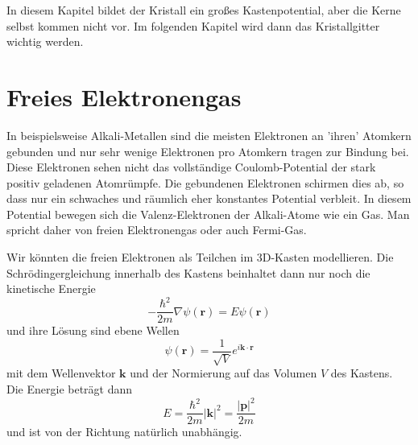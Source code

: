In diesem Kapitel bildet der Kristall ein großes Kastenpotential, aber die Kerne selbst kommen nicht vor. Im folgenden Kapitel wird dann das Kristallgitter wichtig werden.




 


\section{Freies Elektronengas}

In beispielsweise Alkali-Metallen sind die meisten Elektronen an 'ihren' Atomkern gebunden und nur sehr wenige Elektronen pro Atomkern tragen zur Bindung bei. Diese Elektronen sehen nicht das vollständige Coulomb-Potential der stark positiv geladenen Atomrümpfe. Die gebundenen Elektronen schirmen dies ab, so dass nur ein schwaches und räumlich eher konstantes Potential verbleit. In diesem Potential bewegen sich die Valenz-Elektronen der Alkali-Atome wie ein Gas. Man spricht daher von freien Elektronengas oder auch Fermi-Gas.

Wir könnten die freien Elektronen als Teilchen im 3D-Kasten modellieren. Die Schrödingergleichung innerhalb des Kastens beinhaltet dann nur noch die kinetische Energie
\begin{equation}
    - \frac{\hbar^2}{2m} \nabla  \psi(\mathbf{r}) = E  \psi(\mathbf{r})
\end{equation}
und ihre Lösung sind ebene Wellen 
\begin{equation}
    \psi(\mathbf{r}) = \frac{1}{\sqrt{V}} e^{i \mathbf{k} \cdot \mathbf{r}}
\end{equation}
mit dem Wellenvektor $\mathbf{k}$ und der Normierung auf das Volumen $V$ des Kastens. Die Energie beträgt dann
\begin{equation}
    E = \frac{\hbar^2 }{2m} |\mathbf{k}|^2 = \frac{|\mathbf{p}|^2 }{2m} 
\end{equation}
und ist von der Richtung natürlich unabhängig.

